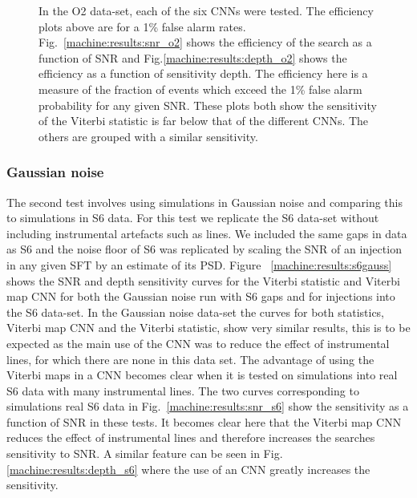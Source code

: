 \begin{figure}
	\caption[O2 results from SOAP and \gls{CNN} search.]{\label{machine:results:o2}  In the O2 data-set, each of the six \glspl{CNN} were tested. The efficiency plots above are for a 1\% false alarm rates.
	Fig.~\ref{machine:results:snr_o2} shows the efficiency of the search as a function of \gls{SNR} and Fig.\ref{machine:results:depth_o2} shows the efficiency as a function of sensitivity depth.
	The efficiency here is a measure of the fraction of events which exceed the 1\% false alarm probability for any given \gls{SNR}.
	These plots both show the sensitivity of the Viterbi statistic is far below that of the different \glspl{CNN}. 
	The others are grouped with a similar sensitivity.}
	
\end{figure}



\subsubsection{Gaussian noise}

%
The second test involves using simulations in Gaussian noise and comparing this to simulations in S6 data.
 For this test we replicate the S6
data-set without including instrumental artefacts such as lines. We included
the same gaps in data as S6 and the noise floor of S6 was replicated by scaling
the \gls{SNR} of an injection in any given \gls{SFT} by an estimate of its \gls{PSD}. 
Figure ~\ref{machine:results:s6gauss}
shows the \gls{SNR} and depth sensitivity curves for the Viterbi statistic and Viterbi map \gls{CNN}
for both the Gaussian noise run with S6 gaps and for injections into the S6
data-set. In the Gaussian noise data-set the curves for both statistics,
Viterbi map \gls{CNN} and the Viterbi statistic, show very similar
results, this is to be expected as the main use of the \gls{CNN} was to reduce
the effect of instrumental lines, for which there are none in this data set.
The advantage of using the Viterbi maps in a \gls{CNN} becomes clear when it is
tested on simulations into real S6 data with many instrumental lines.
The two curves corresponding to simulations real S6 data in Fig.~\ref{machine:results:snr_s6} show the sensitivity as a function of \gls{SNR} in these tests. It becomes clear here that the Viterbi map \gls{CNN} reduces the effect of instrumental
lines and therefore increases the searches sensitivity to \gls{SNR}. 
A similar feature can be seen in Fig.\ref{machine:results:depth_s6} where the use of an \gls{CNN} greatly increases the sensitivity.

